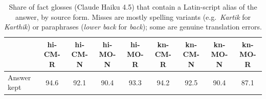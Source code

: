 \begin{table}[h]
\centering
\small
\caption{Share of fact glosses (Claude Haiku 4.5) that contain a Latin-script alias of the answer, by source form. Misses are mostly spelling variants (e.g.\ \emph{Kartik} for \emph{Karthik}) or paraphrases (\emph{lower back} for \emph{back}); some are genuine translation errors.}
\label{tab:gloss}
\begin{tabular}{@{}lcccccccc@{}}
\toprule
 & hi-CM-R & hi-CM-N & hi-MO-N & hi-MO-R & kn-CM-R & kn-CM-N & kn-MO-N & kn-MO-R \\
\midrule
Answer kept & 94.6 & 92.1 & 90.4 & 93.3 & 94.2 & 92.5 & 90.4 & 87.1 \\
\bottomrule
\end{tabular}
\end{table}
